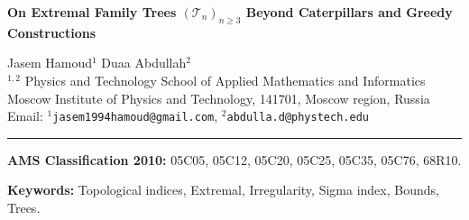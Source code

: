 \documentclass[12pt, a4paper]{article}
\theoremstyle{plain}  %
\theoremstyle{definition}  %
\newcommand{\TT}{\mathcal{T}}
\begin{document}
\begin{center}
{\large \bf  On Extremal Family Trees $(\mathcal{T}_n)_{n\geqslant 3}$ Beyond Caterpillars and Greedy Constructions}
\end{center}
\begin{center}
 Jasem Hamoud$^1$ \hspace{0.2 cm}  Duaa Abdullah$^{2}$\\[6pt]
 $^{1,2}$ Physics and Technology School of Applied Mathematics and Informatics \\
Moscow Institute of Physics and Technology, 141701, Moscow region, Russia\\[6pt]
Email: 	 $^{1}${\tt jasem1994hamoud@gmail.com},
 $^{2}${\tt abdulla.d@phystech.edu}
\end{center}
\noindent
\begin{abstract}
This paper investigates topological indices for the greedy tree $\TT_\mathscr{D}$ associated with a graphic degree sequence $\mathscr{D} = (d_1 \geqslant d_2 \geqslant \dots \geqslant d_n)$ of a tree. A fundamental challenge in the study of topological indices lies in establishing precise bounds, as such findings illuminate intrinsic relationships among diverse indices. We investigate the extremal properties of the graph invariant $\sigma$ over
the family $\mathcal{T}_n$ of all trees on $n \ge 3$ vertices. Specifically,
we compare the minimum values of $\sigma$ attained in restricted subclasses---including
caterpillar trees and greedy trees---with the global minimum over $\mathcal{T}_n$.
We prove that caterpillar trees do not achieve the minimum value of $\sigma$
among all trees, whereas greedy trees attain values no smaller than this global
minimum. Moreover, we show that certain trees, which are neither caterpillars
nor greedy trees, have $\sigma$-values strictly between the global minimum over
$\mathcal{T}_n$ and the minimum among caterpillar trees. These results highlight
structural limitations of these common tree classes in extremal problems and
offer new insights into the role of non-caterpillar, non-greedy trees in
minimizing graph invariants.

\end{abstract}

\noindent\rule{12.2cm}{1.0pt}

\noindent\textbf{AMS Classification 2010:} 05C05, 05C12, 05C20, 05C25, 05C35, 05C76, 68R10.


\noindent\textbf{Keywords:} Topological indices, Extremal, Irregularity, Sigma index, Bounds, Trees.
\end{document}
